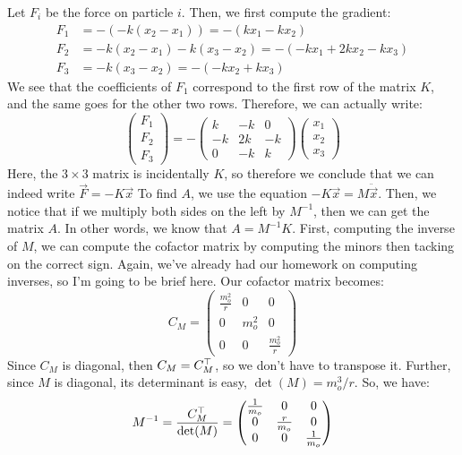 \documentclass{article}
\begin{document}
\begin{solution}
	Let $F_i$ be the force on particle $i$. Then, we first compute the gradient:
	\begin{align*}
		F_1 &= -(-k(x_2 - x_1)) = -(kx_1- kx_2)\\
		F_2 &= -k(x_2 - x_1) - k(x_3 - x_2) = -(-kx_1 + 2kx_2 -kx_3) \\
		F_3 &= -k(x_3 - x_2)  = -(-kx_2 + kx_3)
	\end{align*}
	We see that the coefficients of $F_1$ correspond to the first row of the matrix $K$, and the same goes for 
	the other two rows. Therefore, we can actually write:
	\[
	\begin{pmatrix} F_1\\F_2\\F_3 \end{pmatrix} = - \begin{pmatrix}  k & -k & 0\\ -k & 2k & -k\\ 0 & -k & k \end{pmatrix} \begin{pmatrix} x_1\\x_2\\x_3 \end{pmatrix} 
	\] 
	Here, the $3 \times 3$ matrix is incidentally $K$, so therefore we conclude that we can indeed write $\vec F = 
	-K \vec x$
	To find $A$, we use the equation $-K\vec x = M \ddot{\vec x}$. Then, we notice that if we multiply both 
	sides on the left by $M^{-1}$, then we can get the matrix $A$. In other words, we know that $A = M^{-1}K$. 
	First, computing the inverse of $M$, we can compute the cofactor matrix by computing the minors then 
	tacking on the correct sign. Again, we've already had our homework on computing inverses, so I'm going to 
	be brief here. Our cofactor matrix becomes:
	\[
		C_M = \begin{pmatrix} \frac{m_o^2}{r}& 0 & 0\\ 0 & m_o^2 & 0 \\ 0 & 0 & \frac{m_o^2}{r} \end{pmatrix} 
	\] 
	Since $C_M$ is diagonal, then $C_M = C_M^\top$, so we don't have to transpose it. Further, since $M$ is 
	diagonal, its determinant is easy, $\det(M) = m_o^3 / r$. So, we have: 
	\[
		M^{-1} = \frac{C_M^\top}{\det(M)} = \begin{pmatrix} \frac{1}{m_o} &0 &0\\ 0  & \frac{r}{m_o} & 0 \\ 0 &0 & 
		\frac{1}{m_o}\end{pmatrix} 
\]
\end{solution}
\end{document}
